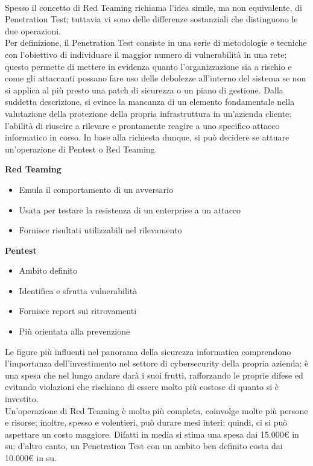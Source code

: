     \\[2em]
    Spesso il concetto di Red Teaming richiama l'idea simile, ma non equivalente, di Penetration Test; tuttavia vi sono delle differenze sostanziali che distinguono le due operazioni.\\
    Per definizione, il Penetration Test consiste in una serie di metodologie e tecniche con l'obiettivo di individuare il maggior numero di vulnerabilità in una rete; questo permette di mettere in evidenza quanto l'organizzazione sia a rischio e come gli attaccanti possano fare uso delle debolezze all'interno del sistema se non si applica al più presto una patch di sicurezza o un piano di gestione. Dalla suddetta descrizione, si evince la mancanza di un elemento fondamentale nella valutazione della protezione della propria infrastruttura in un'azienda cliente: l'abilità di riuscire a rilevare e prontamente reagire a uno specifico attacco informatico in corso. In base alla richiesta dunque, si può decidere se attuare un'operazione di Pentest o Red Teaming.\\[1em]
    \begin{minipage}[t]{0.5\textwidth}
        \centering
        \textbf{Red Teaming}
        \begin{itemize}
            \item Emula il comportamento di un avversario
            \item Usata per testare la resistenza di un enterprise a un attacco 
            \item Fornisce risultati utilizzabili nel rilevamento
        \end{itemize}
    \end{minipage}
    \begin{minipage}[t]{0.5\textwidth}
        \centering
        \textbf{Pentest}
        \begin{itemize}
            \item Ambito definito
            \item Identifica e sfrutta vulnerabilità
            \item Fornisce report sui ritrovamenti
            \item Più orientata alla prevenzione
        \end{itemize}
        \vspace{1.5em}
    \end{minipage}
    Le figure più influenti nel panorama della sicurezza informatica comprendono l'importanza dell'investimento nel settore di cybersecurity della propria azienda; è una spesa che nel lungo andare darà i suoi frutti, rafforzando le proprie difese ed evitando violazioni che rischiano di essere molto più costose di quanto si è investito.\\
    Un'operazione di Red Teaming è molto più completa, coinvolge molte più persone e risorse; inoltre, spesso e volentieri, può durare mesi interi; quindi, ci si può aspettare un costo maggiore. Difatti in media si stima una spesa dai 15.000€ in su; d'altro canto, un Penetration Test con un ambito ben definito costa dai 10.000€ in su.
    
